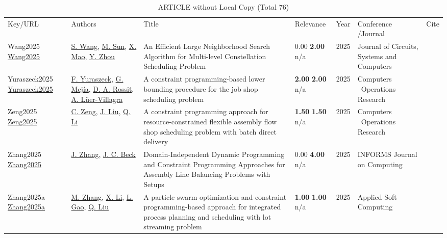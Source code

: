 {\scriptsize
\begin{longtable}{p{3cm}p{5cm}p{10cm}p{1cm}rp{2.5cm}l}
\rowcolor{white}\caption{ARTICLE without Local Copy (Total 76)}\\ \toprule
\rowcolor{white}Key/URL & Authors & Title & Relevance &Year & \shortstack{Conference\\/Journal} & Cite\\ \midrule
\endhead
\bottomrule
\endfoot
Wang2025 \href{https://doi.org/10.1142/s0218126625501555}{Wang2025} & \hyperref[auth:a2150]{S. Wang}, \hyperref[auth:a2151]{M. Sun}, \hyperref[auth:a2152]{X. Mao}, \hyperref[auth:a2153]{Y. Zhou} & An Efficient Large Neighborhood Search Algorithm for Multi-level Constellation Scheduling Problem & \noindent{}\textcolor{black!50}{0.00} \textbf{2.00} n/a & 2025 & Journal of Circuits, Systems and Computers & \cite{Wang2025}\\
Yuraszeck2025 \href{https://doi.org/10.1016/j.cor.2024.106964}{Yuraszeck2025} & \hyperref[auth:a405]{F. Yuraszeck}, \hyperref[auth:a741]{G. Mejía}, \hyperref[auth:a2148]{D. A. Rossit}, \hyperref[auth:a2149]{A. Lüer-Villagra} & A constraint programming-based lower bounding procedure for the job shop scheduling problem & \noindent{}\textbf{2.00} \textbf{2.00} n/a & 2025 & Computers \  Operations Research & \cite{Yuraszeck2025}\\
Zeng2025 \href{https://doi.org/10.1016/j.cor.2024.106855}{Zeng2025} & \hyperref[auth:a2163]{C. Zeng}, \hyperref[auth:a2164]{J. Liu}, \hyperref[auth:a2165]{Q. Li} & A constraint programming approach for resource-constrained flexible assembly flow shop scheduling problem with batch direct delivery & \noindent{}\textbf{1.50} \textbf{1.50} n/a & 2025 & Computers \  Operations Research & \cite{Zeng2025}\\
Zhang2025 \href{https://doi.org/10.1287/ijoc.2024.0603}{Zhang2025} & \hyperref[auth:a796]{J. Zhang}, \hyperref[auth:a89]{J. C. Beck} & Domain-Independent Dynamic Programming and Constraint Programming Approaches for Assembly Line Balancing Problems with Setups & \noindent{}\textcolor{black!50}{0.00} \textbf{4.00} n/a & 2025 & \cellcolor{red!20}INFORMS Journal on Computing & \cite{Zhang2025}\\
Zhang2025a \href{https://doi.org/10.1016/j.asoc.2025.112938}{Zhang2025a} & \hyperref[auth:a2180]{M. Zhang}, \hyperref[auth:a2181]{X. Li}, \hyperref[auth:a1972]{L. Gao}, \hyperref[auth:a2182]{Q. Liu} & A particle swarm optimization and constraint programming-based approach for integrated process planning and scheduling with lot streaming problem & \noindent{}\textbf{1.00} \textbf{1.00} n/a & 2025 & Applied Soft Computing & \cite{Zhang2025a}\\

\end{longtable}}
